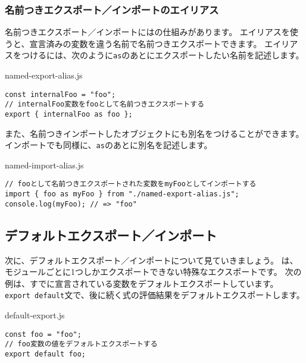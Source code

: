 \hypertarget{named-export-import-alias}{%
\subsubsection{名前つきエクスポート／インポートのエイリアス}\label{named-export-import-alias}}

名前つきエクスポート／インポートには\textbf{}の仕組みがあります。
エイリアスを使うと、宣言済みの変数を違う名前で名前つきエクスポートできます。
エイリアスをつけるには、次のように\texttt{as}のあとにエクスポートしたい名前を記述します。

\begin{listtitle}
named-export-alias.js
\end{listtitle}
\begin{lstlisting}
const internalFoo = "foo";
// internalFoo変数をfooとして名前つきエクスポートする
export { internalFoo as foo };
\end{lstlisting}
\listend

また、名前つきインポートしたオブジェクトにも別名をつけることができます。
インポートでも同様に、\texttt{as}のあとに別名を記述します。

\begin{listtitle}
named-import-alias.js
\end{listtitle}
\begin{lstlisting}
// fooとして名前つきエクスポートされた変数をmyFooとしてインポートする
import { foo as myFoo } from "./named-export-alias.js";
console.log(myFoo); // => "foo"
\end{lstlisting}
\listend

\hypertarget{default-export-import}{%
\subsection{デフォルトエクスポート／インポート}\label{default-export-import}}

次に、デフォルトエクスポート／インポートについて見ていきましょう。
\textbf{}は、モジュールごとに1つしかエクスポートできない特殊なエクスポートです。
次の例は、すでに宣言されている変数をデフォルトエクスポートしています。
\texttt{export default}文で、後に続く式の評価結果をデフォルトエクスポートします。

\begin{listtitle}
default-export.js
\end{listtitle}
\begin{lstlisting}
const foo = "foo";
// foo変数の値をデフォルトエクスポートする
export default foo;
\end{lstlisting}
\listend

